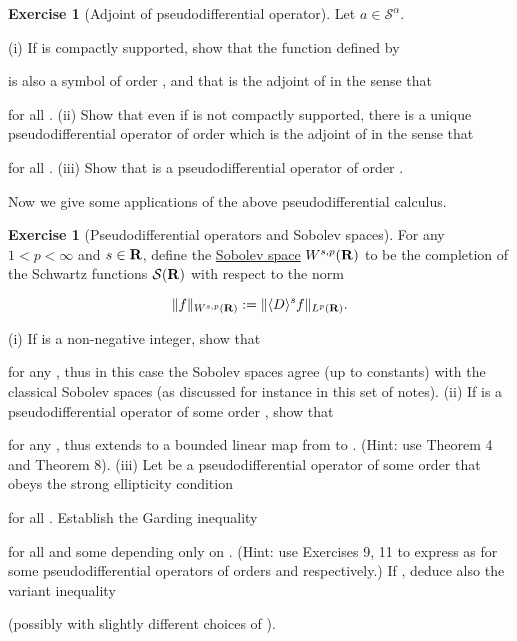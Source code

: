 \documentclass[11pt]{article}
\theoremstyle{definition}
\newtheorem{exercise}[theorem]{Exercise}
\theoremstyle{remark}
\begin{document}
\begin{exercise}[Adjoint of pseudodifferential operator]
 \label{adj-p} Let \({a \in {\mathcal S}^\alpha}\). 


(i) If  is compactly supported, show that the function  defined by

 is also a symbol of order , and that  is the adjoint of  in the sense that 

 for all . 
(ii) Show that even if  is not compactly supported, there is a unique pseudodifferential operator  of order  which is the adjoint of  in the sense that

 for all . 
(iii) Show that  is a pseudodifferential operator of order .



\end{exercise}

Now we give some applications of the above pseudodifferential calculus.


\begin{exercise}[Pseudodifferential operators and Sobolev spaces]
 \label{sob} For any \({1 < p < \infty}\) and \({s \in {\bf R}}\), define the \href{https://en.wikipedia.org/wiki/Sobolev_space}{Sobolev space} \({W^{s,p}({\bf R})}\) to be the completion of the Schwartz functions \({{\mathcal S}({\bf R})}\) with respect to the norm 

\[\displaystyle  \|f\|_{W^{s,p}({\bf R})} := \| \langle D \rangle^s f \|_{L^p({\bf R})}.\]

(i) If  is a non-negative integer, show that

 for any , thus in this case the Sobolev spaces agree (up to constants) with the classical Sobolev spaces (as discussed for instance in this set of notes). 
(ii) If  is a pseudodifferential operator of some order , show that

 for any , thus  extends to a bounded linear map from  to . (Hint: use Theorem 4 and Theorem 8). 
(iii) Let  be a pseudodifferential operator of some order  that obeys the strong ellipticity condition

 for all . Establish the Garding inequality 

 for all  and some  depending only on . (Hint: use Exercises 9, 11 to express  as  for some pseudodifferential operators  of orders  and  respectively.) If , deduce also the variant inequality 

 (possibly with slightly different choices of ). 


\end{exercise}
\end{document}
